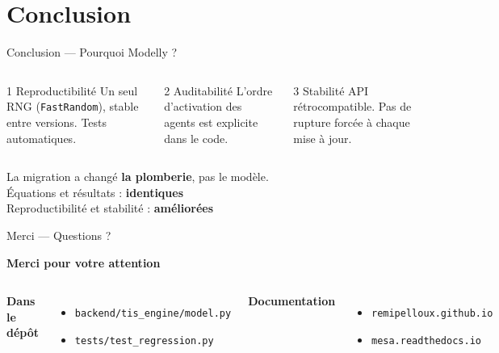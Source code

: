 \documentclass[aspectratio=169, 11pt]{beamer}
\newcommand{\okmark}{\textcolor{good}{\textbf{\checkmark}}}
\begin{document}
\section{Conclusion}

\begin{frame}{Conclusion — Pourquoi Modelly ?}

  \begin{columns}[T]
      \begin{block}{\textnumero{}1 Reproductibilité}
        Un seul RNG (\texttt{FastRandom}), stable entre versions. Tests automatiques.
      \end{block}

      \begin{block}{\textnumero{}2 Auditabilité}
        L'ordre d'activation des agents est explicite dans le code.
      \end{block}

      \begin{block}{\textnumero{}3 Stabilité}
        API rétrocompatible. Pas de rupture forcée à chaque mise à jour.
      \end{block}
  \end{columns}

  \bigskip\bigskip

  \begin{center}
    \large La migration a changé \textbf{la plomberie}, pas le modèle.\\[6pt]
    \normalsize
    Équations et résultats : \textbf{identiques} \okmark\\
    Reproductibilité et stabilité : \textbf{améliorées} \okmark
  \end{center}

\end{frame}

\begin{frame}{Merci — Questions ?}

  \begin{center}
    \Large\textbf{Merci pour votre attention}
  \end{center}

  \bigskip\bigskip

  \begin{columns}[T]
      \textbf{Dans le dépôt}
      \begin{itemize}
        \item \texttt{backend/tis\_engine/model.py}
        \item \texttt{tests/test\_regression.py}
      \end{itemize}

      \textbf{Documentation}
      \begin{itemize}
        \item \texttt{remipelloux.github.io}
        \item \texttt{mesa.readthedocs.io}
      \end{itemize}
  \end{columns}

\end{frame}
\end{document}
